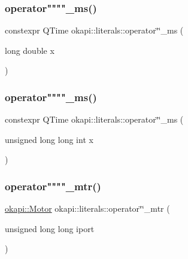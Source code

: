 \mbox{\label{namespaceokapi_1_1literals_adca868a2cc4aefd3551db0c3cea478fe}} 
\subsubsection{\texorpdfstring{operator""""\_ms()}{operator""\_ms()}\hspace{0.1cm}{\footnotesize\ttfamily [1/2]}}
{\footnotesize\ttfamily constexpr Q\+Time okapi\+::literals\+::operator\char`\"{}\char`\"{}\+\_\+ms (\begin{DoxyParamCaption}\item[{long double}]{x }\end{DoxyParamCaption})}

\mbox{\label{namespaceokapi_1_1literals_a3051bde71591186f767c4f1000044b5e}} 
\subsubsection{\texorpdfstring{operator""""\_ms()}{operator""\_ms()}\hspace{0.1cm}{\footnotesize\ttfamily [2/2]}}
{\footnotesize\ttfamily constexpr Q\+Time okapi\+::literals\+::operator\char`\"{}\char`\"{}\+\_\+ms (\begin{DoxyParamCaption}\item[{unsigned long long int}]{x }\end{DoxyParamCaption})}

\mbox{\label{namespaceokapi_1_1literals_afb36c0a052d071526199c356a6bbcf50}} 
\subsubsection{\texorpdfstring{operator""""\_mtr()}{operator""\_mtr()}}
{\footnotesize\ttfamily \mbox{\hyperlink{classokapi_1_1Motor}{okapi\+::\+Motor}} okapi\+::literals\+::operator\char`\"{}\char`\"{}\+\_\+mtr (\begin{DoxyParamCaption}\item[{unsigned long long}]{iport }\end{DoxyParamCaption})}


